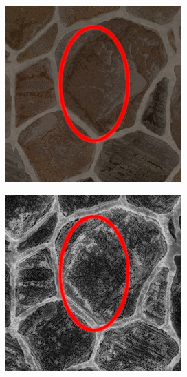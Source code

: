 \begin{figure}
    \centering
    \begin{subfigure}{.45\textwidth}
        \centering
        \includegraphics[width=\textwidth]{contenu/resources/images/stone_zoom}
    \end{subfigure}
    \hfill
    \begin{subfigure}{.45\textwidth}
        \centering
        \includegraphics[width=\textwidth]{contenu/resources/images/stone_zoom_pc}
    \end{subfigure}


\end{figure}
